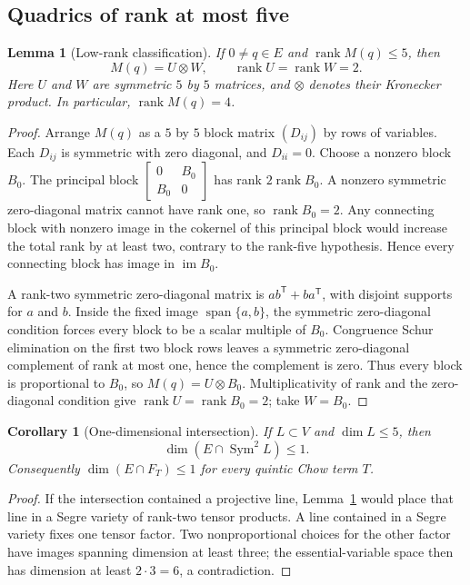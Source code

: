 \documentclass[11pt,reqno]{amsart}
\newtheorem{lemma}[theorem]{Lemma}
\newtheorem{corollary}[theorem]{Corollary}
\theoremstyle{definition}
\newcommand{\Sym}{\operatorname{Sym}}
\newcommand{\rank}{\operatorname{rank}}
\newcommand{\im}{\operatorname{im}}
\newcommand{\Span}{\operatorname{span}}
\begin{document}
\subsection{Quadrics of rank at most five}

\begin{lemma}[Low-rank classification]\label{lem:lowrank}
If \(0\ne q\in E\) and \(\rank M(q)\le5\), then
\[
 M(q)=U\otimes W,\qquad \rank U=\rank W=2.
\]
Here \(U\) and \(W\) are symmetric \(5\) by \(5\) matrices, and
\(\otimes\) denotes their Kronecker product.
In particular, \(\rank M(q)=4\).
\end{lemma}

\begin{proof}
Arrange \(M(q)\) as a \(5\) by \(5\) block matrix \((D_{ij})\) by rows of
variables. Each \(D_{ij}\) is symmetric with zero diagonal, and \(D_{ii}=0\).
Choose a nonzero block \(B_0\). The principal block
\(\left[\begin{smallmatrix}0&B_0\\B_0&0\end{smallmatrix}\right]\) has rank
\(2\rank B_0\). A nonzero symmetric zero-diagonal matrix cannot have rank one,
so \(\rank B_0=2\). Any connecting block with nonzero image in the cokernel of
this principal block would increase the total rank by at least two, contrary
to the rank-five hypothesis. Hence every connecting block has image in
\(\im B_0\).

A rank-two symmetric zero-diagonal matrix is
\(ab^{\mathsf T}+ba^{\mathsf T}\), with disjoint supports for \(a\) and
\(b\). Inside the fixed image \(\Span\{a,b\}\), the symmetric zero-diagonal
condition forces every block to be a scalar multiple of \(B_0\). Congruence
Schur elimination on the first two block rows leaves a symmetric zero-diagonal
complement of rank at most one, hence the complement is zero. Thus every block
is proportional to \(B_0\), so \(M(q)=U\otimes B_0\). Multiplicativity of rank and
the zero-diagonal condition give \(\rank U=\rank B_0=2\); take \(W=B_0\).
\end{proof}

\begin{corollary}[One-dimensional intersection]\label{cor:intersection}
If \(L\subset V\) and \(\dim L\le5\), then
\[
 \dim(E\cap\Sym^2L)\le1.
\]
Consequently \(\dim(E\cap F_T)\le1\) for every quintic Chow term \(T\).
\end{corollary}

\begin{proof}
If the intersection contained a projective line, Lemma~\ref{lem:lowrank}
would place that line in a Segre variety of rank-two tensor products. A line
contained in a Segre variety fixes one tensor factor. Two nonproportional
choices for the other factor have images spanning dimension at least three;
the essential-variable space then has dimension at least \(2\cdot3=6\), a
contradiction.
\end{proof}
\end{document}
